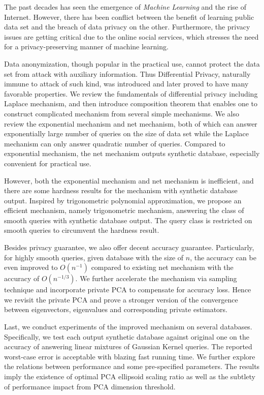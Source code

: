 \begin{eabstract}
  The past decades has seen the emergence of {\itshape Machine Learning} and the rise of Internet. However, there has been conflict between the benefit of learning public data set and the breach of data privacy on the other. Furthermore, the privacy issues are getting critical due to the online social services, which stresses the need for a privacy-preserving manner of machine learning.
  
  Data anonymization, though popular in the practical use, cannot protect the data set from attack with auxiliary information. Thus Differential Privacy, naturally immune to attack of such kind, was introduced and later proved to have many favorable properties. We review the fundamentals of differential privacy including Laplace mechanism, and then introduce composition theorem that enables one to construct complicated mechanism from several simple mechanisms. We also review the exponential mechanism and net mechanism, both of which can answer exponentially large number of queries on the size of data set while the Laplace mechanism can only answer quadratic number of queries. Compared to exponential mechanism, the net mechanism outputs synthetic database, especially convenient for practical use.
  
  However, both the exponential mechanism and net mechanism is inefficient, and there are some hardness results for the mechanism with synthetic database output. Inspired by trigonometric polynomial approximation, we propose an efficient mechanism, namely trigonometric mechanism, answering the class of smooth queries with synthetic database output. The query class is restricted on smooth queries to circumvent the hardness result. 
  
  Besides privacy guarantee, we also offer decent accuracy guarantee. Particularly, for highly smooth queries, given database with the size of $n$, the accuracy can be even improved to $O\left(n^{-1}\right)$ compared to existing net mechanism with the accuracy of $O\left(n^{-1/3}\right)$. We further accelerate the mechanism via sampling technique and incorporate private PCA to compensate for accuracy loss. Hence we revisit the private PCA and prove a stronger version of the convergence between eigenvectors, eigenvalues and corresponding private estimators. 
  
  Last, we conduct experiments of the improved mechanism on several databases. Specifically, we test each output synthetic database against original one on the accuracy of answering linear mixtures of Gaussian Kernel queries. The reported worst-case error is acceptable with blazing fast running time. We further explore the relations between performance and some pre-specified parameters. The results imply the existence of optimal PCA ellipsoid scaling ratio as well as the subtlety of performance impact from PCA dimension threshold.
\end{eabstract}